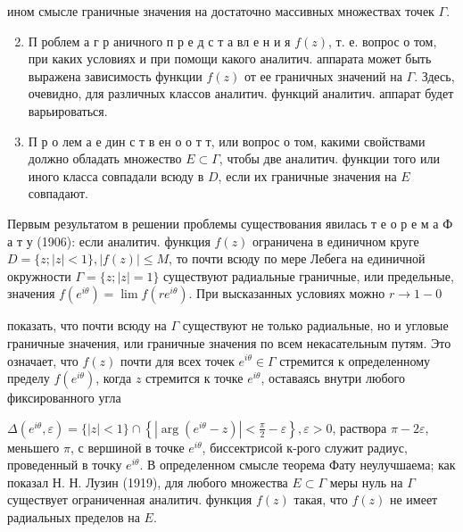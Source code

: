 \documentclass[10pt]{article}
\begin{document}
ином смысле граничные значения на достаточно массивных множествах точек $\Gamma$.



\begin{enumerate}

  \setcounter{enumi}{1}

  \item П роблем а г р аничного п р е д с т а вл е н и я $f(z)$, т. е. вопрос о том, при каких условиях и при помощи какого аналитич. аппарата может быть выражена зависимость функции $f(z)$ от ее граничных значений на $\Gamma$. Здесь, очевидно, для различных классов аналитич. функций аналитич. аппарат будет варьироваться.



  \item П р о лем а е дин с т в ен о о т т, или вопрос о том, какими свойствами должно обладать множество $E \subset \Gamma$, чтобы две аналитич. функции того или иного класса совпадали всюду в $D$, если их граничные значения на $E$ совпадают.



\end{enumerate}



Первым результатом в решении проблемы существования явилась т е о р е м а Ф а т у (1906): если аналитич. функция $f(z)$ ограничена в единичном круге $D=\{z ;|z|<1\},|f(z)| \leqslant M$, то почти всюду по мере Лебега на единичной окружности $\Gamma=\{z ;|z|=1\}$ существуют радиальные граничные, или предельные, значения $f\left(e^{i \theta}\right)=\lim f\left(r e^{i \theta}\right)$. При высказанных условиях можно $r \rightarrow 1-0$

показать, что почти всюду на $\Gamma$ существуют не только радиальные, но и угловые граничные значения, или граничные значения по всем некасательным путям. Это означает, что $f(z)$ почти для всех точек $e^{i \theta} \in \Gamma$ стремится к определенному пределу $f\left(e^{i \theta}\right)$, когда $z$ стремится к точке $e^{i \theta}$, оставаясь внутри любого фиксированного угла



$\Delta\left(e^{i \theta}, \varepsilon\right)=\{|z|<1\} \cap\left\{\left|\arg \left(e^{i \theta}-z\right)\right|<\frac{\pi}{2}-\varepsilon\right\}, \varepsilon>0$, раствора $\pi-2 \varepsilon$, меньшего $\pi$, с вершиной в точке $e^{i \theta}$, биссектрисой к-рого служит радиус, проведенный в точку $e^{i \theta}$. В определенном смысле теорема Фату неулучшаема; как показал Н. Н. Лузин (1919), для любого множества $E \subset \Gamma$ меры нуль на $\Gamma$ существует ограниченная аналитич. функция $f(z)$ такая, что $f(z)$ не имеет радиальных пределов на $E$.
\end{document}
